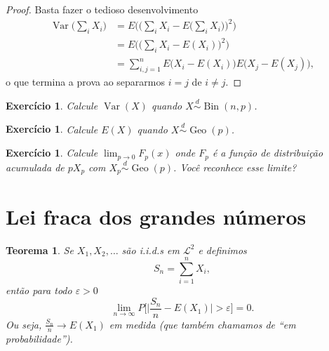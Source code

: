 \documentclass[reqno, final]{book}
\newcommand*\1{\mathds{1}}
\newtheorem{theorem}{Teorema}[section]
\newtheorem{exercise}[example]{Exercício}
\DeclareMathOperator{\Var}{Var}
\DeclareMathOperator{\Geo}{Geo}
\DeclareMathOperator{\Bin}{Bin}
\begin{document}
\begin{proof}
  Basta fazer o tedioso desenvolvimento
  \begin{equation}
    \begin{split}
      \Var\Big(\sum_i X_i\Big) & = E \Big( \Big(\sum_i X_i - E\Big(\sum_i X_i\Big)\Big)^2\Big)\\
      & = E \Big( \Big(\sum_i X_i - E(X_i)\Big)^2\Big)\\
      & = \sum_{i, j = 1}^n E \big(X_i - E(X_i)\big) E\big(X_j - E(X_j)\big),
    \end{split}
  \end{equation}
  o que termina a prova ao separarmos $i = j$ de $i \neq j$.
\end{proof}

\begin{exercise}
  Calcule $\Var(X)$ quando $X \overset{d}\sim \Bin(n, p)$.
\end{exercise}

\begin{exercise}
  Calcule $E(X)$ quando $X \overset{d}\sim \Geo(p)$.
\end{exercise}

\begin{exercise}
  Calcule $\lim_{p \to 0} F_p(x)$ onde $F_p$ é a função de distribuição acumulada de $p X_p$ com $X_p \overset{d}\sim \Geo(p)$.
  Você reconhece esse limite?
\end{exercise}

\section{Lei fraca dos grandes números}


\begin{theorem}
  \label{t:lei_fraca}
  Se $X_1, X_2, \dots$ são i.i.d.s em $\mathcal{L}^2$ e definimos
  \begin{equation}
    S_n = \sum_{i=1}^n X_i,
  \end{equation}
  então para todo $\varepsilon > 0$
  \begin{equation}
    \lim_{n \to \infty} P \Big[\Big| \frac{S_n}{n} - E(X_1)\Big| > \varepsilon \Big] = 0.
  \end{equation}
  Ou seja, $\tfrac{S_n}{n} \to E(X_1)$ em medida (que também chamamos de ``em probabilidade'').
\end{theorem}
\end{document}
